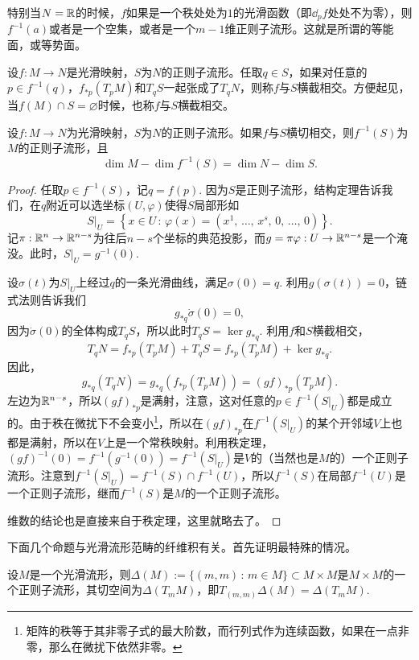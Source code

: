 特别当$N=\mathbb{R}$的时候，$f$如果是一个秩处处为$1$的光滑函数（即$\dd_p f$处处不为零），则$f^{-1}(a)$或者是一个空集，或者是一个$m-1$维正则子流形。这就是所谓的等能面，或等势面。

\begin{para}[横截相交]
设$f:M\to N$是光滑映射，$S$为$N$的正则子流形。任取$q\in S$，如果对任意的$p\in f^{-1}(q)$，$f_{*p}(T_pM)$和$T_qS$一起张成了$T_q N$，则称$f$与$S$横截相交。方便起见，当$f(M)\cap S=\varnothing$时候，也称$f$与$S$横截相交。
\end{para}

\begin{thm}\label{thm:2.17}
设$f:M\to N$为光滑映射，$S$为$N$的正则子流形。如果$f$与$S$横切相交，则$f^{-1}(S)$为$M$的正则子流形，且
\[
	\dim M-\dim f^{-1}(S)=\dim N-\dim S.
\]
\end{thm}

\begin{proof}
任取$p\in f^{-1}(S)$，记$q=f(p)$. 因为$S$是正则子流形，结构定理告诉我们，在$q$附近可以选坐标$(U,\varphi)$使得$S$局部形如
\[
	S|_U=\left\{x\in U\,:\, \varphi(x)=\left(x^1\text{, $\dots$, }x^s\text{, }0\text{, $\dots$, }0\right)\right\}.
\]
记$\pi:\mathbb{R}^n\to \mathbb{R}^{n-s}$为往后$n-s$个坐标的典范投影，而$g=\pi\varphi:U\to \mathbb{R}^{n-s}$是一个淹没。此时，$S|_U=g^{-1}(0)$. 

设$\sigma(t)$为$S|_U$上经过$q$的一条光滑曲线，满足$\sigma(0)=q$. 利用$g(\sigma(t))=0$，链式法则告诉我们
\[
	g_{*q}\dot\sigma(0)=0,
\]
因为$\dot\sigma(0)$的全体构成$T_qS$，所以此时$T_qS=\ker g_{*q}$. 利用$f$和$S$横截相交，
\[
	T_q N=f_{*p}(T_pM)+T_qS=f_{*p}(T_pM)+\ker g_{*q}.
\]
因此，
\[
	g_{*q}(T_q N)=g_{*q}\left(f_{*p}(T_pM)\right)=(gf)_{*p}(T_pM).
\]
左边为$\mathbb{R}^{n-s}$，所以$(gf)_{*p}$是满射，注意，这对任意的$p\in f^{-1}(S|_U)$都是成立的。由于秩在微扰下不会变小\footnote{矩阵的秩等于其非零子式的最大阶数，而行列式作为连续函数，如果在一点非零，那么在微扰下依然非零。}，所以在$(gf)_{*p}$在$f^{-1}(S|_U)$的某个开邻域$V$上也都是满射，所以在$V$上是一个常秩映射。利用秩定理，$(gf)^{-1}(0)=f^{-1}(g^{-1}(0))=f^{-1}(S|_U)$是$V$的（当然也是$M$的）一个正则子流形。注意到$f^{-1}(S|_U)=f^{-1}(S)\cap f^{-1}(U)$，所以$f^{-1}(S)$在局部$f^{-1}(U)$是一个正则子流形，继而$f^{-1}(S)$是$M$的一个正则子流形。

维数的结论也是直接来自于秩定理，这里就略去了。
\end{proof}

下面几个命题与光滑流形范畴的纤维积有关。首先证明最特殊的情况。

\begin{lem}
设$M$是一个光滑流形，则$\Delta(M):=\{(m,m)\,:\,m\in M\}\subset M\times M$是$M\times M$的一个正则子流形，其切空间为$\Delta(T_mM)$，即$T_{(m,m)}\Delta(M)=\Delta(T_mM)$.
\end{lem}

